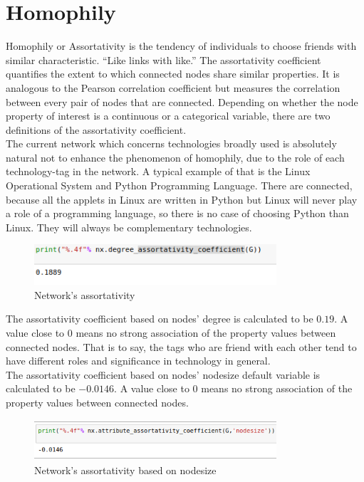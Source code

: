 \documentclass[12pt]{article}
\begin{document}
				
		\section{Homophily}
			Homophily or Assortativity  is the tendency of individuals to choose friends with similar characteristic. “Like links with like.”
			The assortativity coefficient quantifies the extent to which connected nodes share similar  properties.  It  is  analogous  to  the  Pearson  correlation  coefficient  but measures  the  correlation  between  every  pair  of  nodes  that  are  connected. Depending  on  whether  the  node  property  of  interest  is  a  continuous  or  a categorical variable, there are two definitions of the assortativity coefficient.\\
			The current network which concerns technologies broadly used is absolutely natural not to enhance the phenomenon of homophily, due to the role of each technology-tag in the network. A typical example of that is the Linux  Operational System and Python Programming Language. There are connected, because all the applets in Linux are written in Python but Linux will never play a role of a programming language, so there is no case of choosing Python than Linux. They will always be complementary technologies. 
			\begin{figure}[ht]
				\centering
				\includegraphics[width=9cm,height=1.5cm]{assortativity}
				\caption{Network's assortativity}
			\end{figure}
			\FloatBarrier
			The assortativity coefficient based on nodes' degree is calculated to be $0.19$. A  value close to 0 means no strong association of the property values between connected nodes. That is to say, the tags who are friend with each other tend to have different roles and significance in technology in general. \\
			The assortativity coefficient based on nodes' nodesize default variable is calculated to be $-0.0146$. A  value close to 0 means no strong association of the property values between connected nodes.\\
			\begin{figure}[ht]
				\centering
				\includegraphics[width=9cm,height=1.5cm]{nodesizeassort}
				\caption{Network's assortativity based on nodesize}
			\end{figure}
\end{document}
